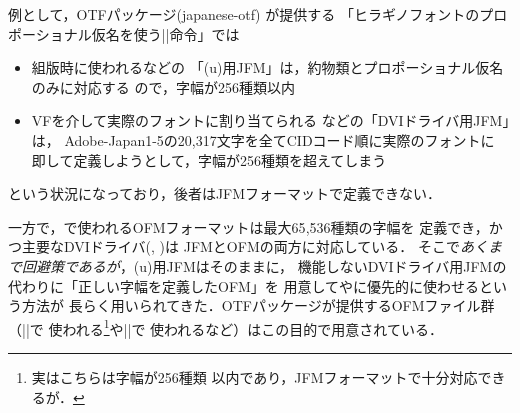 \documentclass[a4paper,11pt,nomag]{jsarticle}
\begin{document}
例として，OTFパッケージ(japanese-otf) \cite{jotf}が提供する
「ヒラギノフォントのプロポーショナル仮名を使う|\propshape|命令」では
\begin{itemize}
 \item 組版時に使われるなどの
  「(u)\pTeX 用JFM」は，約物類とプロポーショナル仮名のみに対応する
  ので，字幅が256種類以内
 \item VFを介して実際のフォントに割り当てられる
  などの「DVIドライバ用JFM」は，
  Adobe-Japan1-5の20{,}317文字を全てCIDコード順に実際のフォントに
  即して定義しようとして，字幅が256種類を超えてしまう
\end{itemize}
という状況になっており，後者はJFMフォーマットで定義できない．

一方で，\OMEGA で使われるOFMフォーマットは最大65{,}536種類の字幅を
定義でき，かつ主要なDVIドライバ(, )は
JFMとOFMの両方に対応している．
そこで\emph{あくまで回避策であるが}，(u)\pTeX 用JFMはそのままに，
機能しないDVIドライバ用JFMの代わりに「正しい字幅を定義したOFM」を
用意してやに優先的に使わせるという方法が
長らく用いられてきた．OTFパッケージが提供するOFMファイル群（|\CID|で
使われる\footnote{実はこちらは字幅が256種類
以内であり，JFMフォーマットで十分対応できるが．}や|\propshape|で
使われるなど）はこの目的で用意されている\cite{cidofm}．
\end{document}
